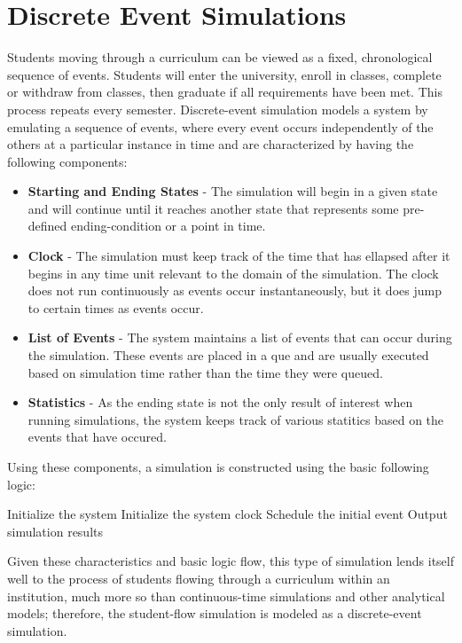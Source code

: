 \documentclass[botnum, fleqn]{unmeethesis}
\begin{document}
  \section{Discrete Event Simulations}
  Students moving through a curriculum can be viewed as a fixed, chronological sequence of events. Students will enter the university, enroll in classes, complete or withdraw from classes, then graduate if all requirements have been met. This process repeats every semester. Discrete-event simulation models a system by emulating a sequence of events, where every event occurs independently of the others at a particular instance in time and are characterized by having the following components:

  \begin{itemize}
  \item \textbf{Starting and Ending States} - The simulation will begin in a given state and will continue until it reaches another state that represents some pre-defined ending-condition or a point in time.
  \item \textbf{Clock} - The simulation must keep track of the time that has ellapsed after it begins in any time unit relevant to the domain of the simulation. The clock does not run continuously as events occur instantaneously, but it does jump to certain times as events occur.
  \item \textbf{List of Events} - The system maintains a list of events that can occur during the simulation. These events are placed in a que and are usually executed based on simulation time rather than the time they were queued.
  \item \textbf{Statistics} - As the ending state is not the only result of interest when running simulations, the system keeps track of various statitics based on the events that have occured.
  \end{itemize}

  Using these components, a simulation is constructed using the basic following logic:

  \begin{algorithmic}[1]
  \STATE Initialize the system
  \STATE Initialize the system clock
  \STATE Schedule the initial event
  \ENDWHILE
  \STATE Output simulation results
  \end{algorithmic}

  Given these characteristics and basic logic flow, this type of simulation lends itself well to the process of students flowing through a curriculum within an institution, much more so than continuous-time simulations and other analytical models; therefore, the student-flow simulation is modeled as a discrete-event simulation.
\end{document}
